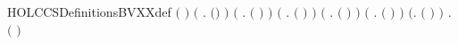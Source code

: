 \begin{SaveVerbatim}{HOLCCSDefinitionsBVXXdef}
\HOLTokenTurnstile{} \ensuremath{(}  \HOLSymConst{\ensuremath{=}} \HOLTokenLeftbrace{}\HOLTokenRightbrace{}\ensuremath{)} \HOLSymConst{\HOLTokenConj{}} \ensuremath{(}\HOLSymConst{\HOLTokenForall{}} .  \ensuremath{(}\HOLSymConst{\ensuremath{\ldotp}}\ensuremath{)} \HOLSymConst{\ensuremath{=}}  \ensuremath{)} \HOLSymConst{\HOLTokenConj{}}
   \ensuremath{(}\HOLSymConst{\HOLTokenForall{}} .  \ensuremath{(} \HOLSymConst{\ensuremath{+}} \ensuremath{)} \HOLSymConst{\ensuremath{=}}   \HOLConst{\HOLTokenUnion{}}  \ensuremath{)} \HOLSymConst{\HOLTokenConj{}}
   \ensuremath{(}\HOLSymConst{\HOLTokenForall{}} .  \ensuremath{(} \HOLSymConst{\ensuremath{\mid}} \ensuremath{)} \HOLSymConst{\ensuremath{=}}   \HOLConst{\HOLTokenUnion{}}  \ensuremath{)} \HOLSymConst{\HOLTokenConj{}}
   \ensuremath{(}\HOLSymConst{\HOLTokenForall{}} .  \ensuremath{(}  \ensuremath{)} \HOLSymConst{\ensuremath{=}}  \ensuremath{)} \HOLSymConst{\HOLTokenConj{}}
   \ensuremath{(}\HOLSymConst{\HOLTokenForall{}} .  \ensuremath{(}  \ensuremath{)} \HOLSymConst{\ensuremath{=}}  \ensuremath{)} \HOLSymConst{\HOLTokenConj{}} \ensuremath{(}\HOLSymConst{\HOLTokenForall{}}.  \ensuremath{(} \ensuremath{)} \HOLSymConst{\ensuremath{=}} \HOLTokenLeftbrace{}\HOLTokenRightbrace{}\ensuremath{)} \HOLSymConst{\HOLTokenConj{}}
   \HOLSymConst{\HOLTokenForall{}} .  \ensuremath{(}  \ensuremath{)} \HOLSymConst{\ensuremath{=}}    
\end{SaveVerbatim}
\newcommand{\HOLCCSDefinitionsBVXXdef}{\UseVerbatim{HOLCCSDefinitionsBVXXdef}}
